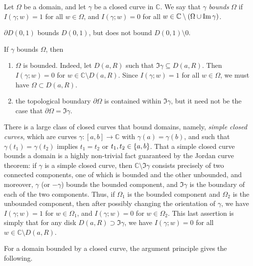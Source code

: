 \begin{definition}
	Let \( \Omega \) be a domain, and let \( \gamma \) be a closed curve in \( \mathbb C \).
	We say that \( \gamma \) \textit{bounds} \( \Omega \) if \( I(\gamma;w) = 1 \) for all \( w \in \Omega \), and \( I(\gamma;w) = 0 \) for all \( w \in \mathbb C \setminus \qty(\Omega \cup \Im \gamma) \).
\end{definition}
\begin{example}
	\( \partial D(0,1) \) bounds \( D(0,1) \), but does not bound \( D(0,1) \setminus \qty{0} \).
\end{example}
\begin{remark}
	If \( \gamma \) bounds \( \Omega \), then
	\begin{enumerate}
		\item \( \Omega \) is bounded.
		      Indeed, let \( D(a,R) \) such that \( \Im \gamma \subseteq D(a,R) \).
		      Then \( I(\gamma;w) = 0 \) for \( w \in \mathbb C \setminus D(a,R) \).
		      Since \( I(\gamma;w) = 1 \) for all \( w \in \Omega \), we must have \( \Omega \subset D(a,R) \).
		\item the topological boundary \( \partial \Omega \) is contained within \( \Im \gamma \), but it need not be the case that \( \partial \Omega = \Im \gamma \).
	\end{enumerate}
	There is a large class of closed curves that bound domains, namely, \textit{simple closed curves}, which are curves \( \gamma \colon [a,b] \to \mathbb C \) with \( \gamma(a) = \gamma(b) \), and such that \( \gamma(t_1) = \gamma(t_2) \) implies \( t_1 = t_2 \) or \( t_1, t_2 \in \qty{a,b} \).
	That a simple closed curve bounds a domain is a highly non-trivial fact guaranteed by the Jordan curve theorem: if \( \gamma \) is a simple closed curve, then \( \mathbb C \setminus \Im \gamma \) consists precisely of two connected components, one of which is bounded and the other unbounded, and moreover, \( \gamma \) (or \( -\gamma \)) bounds the bounded component, and \( \Im \gamma \) is the boundary of each of the two components.
	Thus, if \( \Omega_1 \) is the bounded component and \( \Omega_2 \) is the unbounded component, then after possibly changing the orientation of \( \gamma \), we have \( I(\gamma;w) = 1 \) for \( w \in \Omega_1 \), and \( I(\gamma;w) = 0 \) for \( w \in \Omega_2 \).
	This last assertion is simply that for any disk \( D(a,R) \supset \Im \gamma \), we have \( I(\gamma;w) = 0 \) for all \( w \in \mathbb C \setminus D(a,R) \).
\end{remark}
For a domain bounded by a closed curve, the argument principle gives the following.
